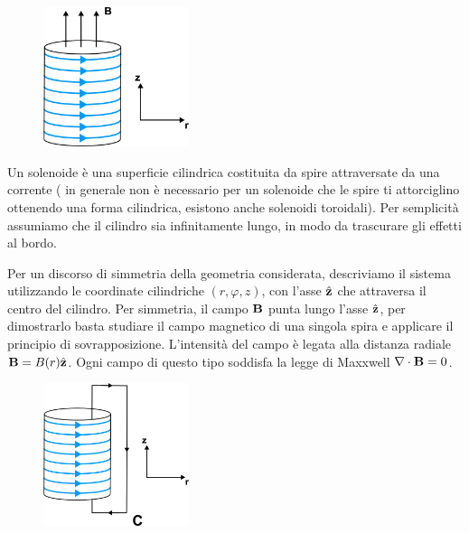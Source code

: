 \begin{figure} %
    \centering
    \includegraphics[width=0.38\textwidth]{images/solenoidfield}
\end{figure}
Un solenoide \`e una superficie cilindrica costituita da spire attraversate da una corrente ( in generale non \`e necessario per un solenoide che le spire ti attorciglino ottenendo una forma cilindrica, esistono anche solenoidi toroidali). Per semplicit\`a assumiamo che il cilindro sia infinitamente lungo, in modo da trascurare gli effetti al bordo.
\newline

Per un discorso di simmetria della geometria considerata, descriviamo il sistema utilizzando le coordinate cilindriche $(r,\varphi,z)$, con l'asse $\hat{\bold{z}}$ che attraversa il centro del cilindro. Per simmetria, il campo $\bold{B}$ punta lungo l'asse $\hat{\bold{z}}$, per dimostrarlo basta studiare il campo magnetico di una singola spira e applicare il principio di sovrapposizione. L'intensit\`a del campo \`e legata alla distanza radiale $\bold{B} = B(r) \hat{\bold{z}}$. Ogni campo di questo tipo soddisfa la legge di Maxxwell $\nabla \cdot \bold{B} = 0$.

\begin{figure} %
    \centering
    \includegraphics[width=0.38\textwidth]{images/solenoidpath}
\end{figure}

